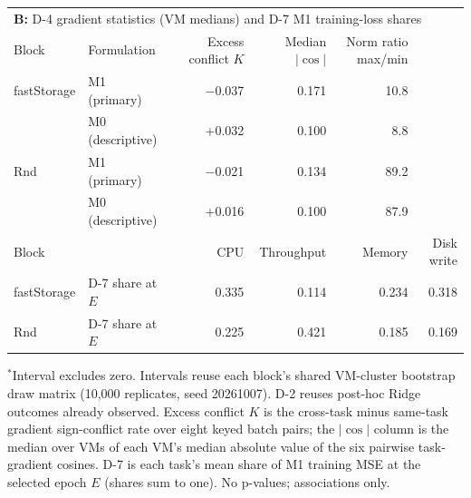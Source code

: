 \begin{table}[t]
\begin{tabular*}{\textwidth}{@{\extracolsep{\fill}}lllrrrr@{}}
    \midrule
    \multicolumn{7}{l}{\textbf{B:} D-4 gradient statistics (VM medians) and D-7 M1 training-loss shares} \\
    Block & Formulation & & Excess conflict $K$ & Median $|\cos|$ & Norm ratio max/min & \\
    \midrule
    fastStorage & M1 (primary) & & $-$0.037 & 0.171 & 10.8 & \\
     & M0 (descriptive) & & +0.032 & 0.100 & 8.8 & \\
    Rnd & M1 (primary) & & $-$0.021 & 0.134 & 89.2 & \\
     & M0 (descriptive) & & +0.016 & 0.100 & 87.9 & \\
    \midrule
    Block & & & CPU & Throughput & Memory & Disk write \\
    \midrule
    fastStorage & D-7 share at $E$ & & 0.335 & 0.114 & 0.234 & 0.318 \\
    Rnd & D-7 share at $E$ & & 0.225 & 0.421 & 0.185 & 0.169 \\
    \bottomrule
  \end{tabular*}

  \vspace{2pt}
  \parbox{\textwidth}{\footnotesize $^{*}$Interval excludes zero. Intervals reuse each block's shared VM-cluster bootstrap draw matrix (10{,}000 replicates, seed 20261007). D-2 reuses post-hoc Ridge outcomes already observed. Excess conflict $K$ is the cross-task minus same-task gradient sign-conflict rate over eight keyed batch pairs; the $|\cos|$ column is the median over VMs of each VM's median absolute value of the six pairwise task-gradient cosines. D-7 is each task's mean share of M1 training MSE at the selected epoch $E$ (shares sum to one). No p-values; associations only.}
\end{table}
